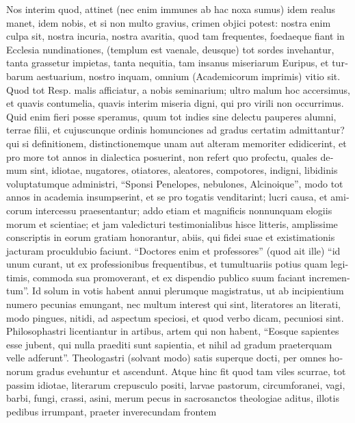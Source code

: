\begin{latin}
Nos interim quod, attinet (nec enim immunes ab hac noxa sumus) idem realus
manet, idem nobis, et si non multo gravius, crimen objici potest: nostra enim
culpa sit, nostra incuria, nostra avaritia, quod tam frequentes, foedaeque
fiant in Ecclesia nundinationes, (templum est vaenale, deusque) tot sordes
invehantur, tanta grassetur impietas, tanta nequitia, tam insanus miseriarum
Euripus, et turbarum aestuarium, nostro inquam, omnium (Academicorum
imprimis) vitio sit. Quod tot Resp. malis afficiatur, a nobis seminarium;
ultro malum hoc accersimus, et quavis contumelia, quavis interim miseria
digni, qui pro virili non occurrimus. Quid enim fieri posse speramus, quum
tot indies sine delectu pauperes alumni, terrae filii, et cujuscunque ordinis
homunciones ad gradus certatim admittantur? qui si definitionem,
distinctionemque unam aut alteram memoriter edidicerint, et pro more tot
annos in dialectica posuerint, non refert quo profectu, quales demum sint,
idiotae, nugatores, otiatores, aleatores, compotores, indigni, libidinis
voluptatumque administri, \enquote{Sponsi Penelopes, nebulones, Alcinoique}, modo tot
annos in academia insumpserint, et se pro togatis venditarint; lucri causa,
et amicorum intercessu praesentantur; addo etiam et magnificis nonnunquam
elogiis morum et scientiae; et jam valedicturi testimonialibus hisce
litteris, amplissime conscriptis in eorum gratiam honorantur, abiis, qui
fidei suae et existimationis jacturam proculdubio faciunt. \enquote{Doctores enim et
professores} (quod ait ille) \enquote{id unum curant, ut ex
professionibus frequentibus, et tumultuariis potius quam legitimis, commoda
sua promoverant, et ex dispendio publico suum faciant incrementum}. Id solum
in votis habent annui plerumque magistratus, ut ab incipientium numero
pecunias emungant, nec multum interest qui sint,
literatores an literati, modo pingues, nitidi, ad aspectum speciosi, et quod
verbo dicam, pecuniosi sint. Philosophastri licentiantur
in artibus, artem qui non habent, \enquote{Eosque sapientes esse
jubent, qui nulla praediti sunt sapientia, et nihil ad gradum praeterquam
velle adferunt}. Theologastri (solvant modo) satis superque docti, per omnes
honorum gradus evehuntur et ascendunt. Atque hinc fit quod tam viles scurrae,
tot passim idiotae, literarum crepusculo positi, larvae pastorum,
circumforanei, vagi, barbi, fungi, crassi, asini, merum pecus in sacrosanctos
theologiae aditus, illotis pedibus irrumpant, praeter inverecundam frontem

\end{latin}
